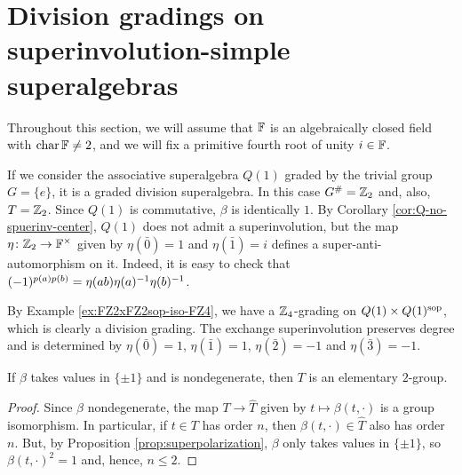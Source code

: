 
\section{Division gradings on superinvolution-simple\texorpdfstring{\\}{} superalgebras}\label{sec:div-grads-on-sinv-simple}

Throughout this section, we will assume that $\mathbb{F}$ is an algebraically closed field with $\operatorname{char} \mathbb{F} \neq 2$, and we will fix a primitive fourth root of unity $i \in \mathbb{F}$.

\begin{ex}
	If we consider the associative superalgebra $Q(1)$ graded by the trivial group $G = \{e\}$, it is a graded division superalgebra.
	In this case $G^\# = \mathbb{Z}_2$ and, also, $T = \mathbb{Z}_2$.
	Since $Q(1)$ is commutative, $\beta$ is identically $1$.
	By Corollary \ref{cor:Q-no-spuerinv-center}, $Q(1)$ does not admit a superinvolution, but the map $\eta\colon \mathbb{Z}_2 \to \mathbb{F}^\times$ given by $\eta (\bar 0) = 1$ and $\eta( \bar 1) = i$ defines a super-anti-automorphism on it.
	Indeed, it is easy to check that $(-1)^{p(a) p(b)} =  \eta(ab) \eta(a)^{-1} \eta(b)^{-1}$.
\end{ex}

\begin{ex}\label{ex:FZ4-revisited}
	By Example \ref{ex:FZ2xFZ2sop-iso-FZ4}, we have a $\mathbb{Z}_4$-grading on $Q(1)\times Q(1)^{\mathrm{sop}}$, which is clearly a division grading.
	The exchange superinvolution preserves degree and is determined by $\eta (\bar 0) = 1$, $\eta (\bar 1) = 1$, $\eta (\bar 2) = -1$ and $\eta (\bar 3) = -1$.
\end{ex}

\begin{lemma}\label{lemma:beta-nondeg-elem-2-grp}
	If $\beta$ takes values in $\{ \pm 1 \}$ and is nondegenerate, then $T$ is an elementary $2$-group.
\end{lemma}

\begin{proof}
	Since $\beta$ nondegenerate, the map $T \to \widehat T$ given by $t \mapsto \beta(t, \cdot)$ is a group isomorphism.
	In particular, if $t\in T$ has order $n$, then $\beta(t, \cdot)\in \widehat T$ also has order $n$.
	But, by Proposition \ref{prop:superpolarization}, $\beta$ only takes values in $\{ \pm 1\}$, so  $\beta(t, \cdot )^2 =1$ and, hence, $ n \leq 2$.
\end{proof}

